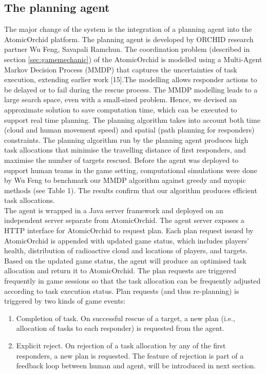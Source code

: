 \subsection{The planning agent}\label{sec:studyoneagent}
The major change of the system is the integration of a planning agent into the AtomicOrchid platform. The planning agent is developed by ORCHID research partner Wu Feng, Savapali Ramchun. The coordination problem (described in section \ref{sec:gamemechanic}) of the AtomicOrchid is modelled using a Multi-Agent Markov Decision Process (MMDP) that captures the uncertainties of task execution, extending earlier work [15].The modelling allows responder actions to be delayed or to fail during the rescue process. The MMDP modelling leads to a large search space, even with a small-sized problem. Hence, we devised an approximate solution to save computation time, which can be executed to support real time planning. The planning algorithm takes into account both time (cloud and human movement speed) and spatial (path planning for responders) constraints. The planning algorithm run by the planning agent produces high task allocations that minimise the travelling distance of first responders, and maximise the number of targets rescued. Before the agent was deployed to support human teams in the game setting, computational simulations were done by Wu Feng to benchmark our MMDP algorithm against greedy and myopic methods (see Table 1). The results confirm that our algorithm produces efficient task allocations.\\

The agent is wrapped in a Java server framework and deployed on an independent server separate from AtomicOrchid. The agent server exposes a HTTP interface for AtomicOrchid to request plan. Each plan request issued by AtomicOrchid is appended with  updated game status, which includes players' health, distribution of radioactive cloud and locations of players, and targets. Based on the updated game status, the agent will produce an optimised task allocation and return it to AtomicOrchid. The plan requests are triggered frequently in game sessions so that the task allocation can be frequently adjusted according to task execution status. Plan requests (and thus re-planning) is triggered by two kinds of game events:\\


\begin{enumerate}
\item Completion of task. On successful rescue of a target, a new plan (i.e., allocation of tasks to each responder) is requested from the agent.\\

\item Explicit reject. On rejection of a task allocation by any of the first responders, a new plan is requested.  The feature of rejection is part of a feedback loop between human and agent, will be introduced in next section.\\

\end{enumerate}


